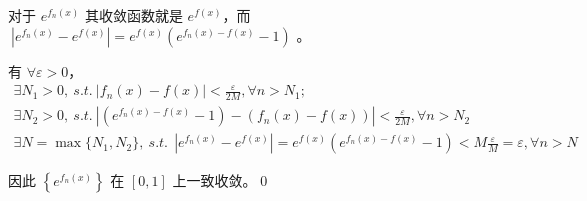 对于 $\displaystyle e^{f_{n}( x)}$ 其收敛函数就是 $\displaystyle e^{f( x)}$，而$\displaystyle \ |e^{f_{n}( x)} -e^{f( x)} |=e^{f( x)}\left( e^{f_{n}( x) -f( x)} -1\right)$ 。

有 $\displaystyle \forall \varepsilon  >0$，
\begin{gather*}
	\exists N_{1}  >0,\ s.t.\ |f_{n}( x) -f( x) |< \frac{\varepsilon }{2M} ,\forall n >N_{1} ;\\
	\exists N_{2}  >0,\ s.t.\ |\left( e^{f_{n}( x) -f( x)} -1\right) -( f_{n}( x) -f( x)) |< \frac{\varepsilon }{2M} ,\forall n > N_{2}\\
	\exists N=\max\{N_{1} ,N_{2}\} ,\ s.t.\ \ |e^{f_{n}( x)} -e^{f( x)} |=e^{f( x)}\left( e^{f_{n}( x) -f( x)} -1\right) < M\frac{\varepsilon }{M} =\varepsilon ,\forall n >N
\end{gather*}

因此 $\displaystyle \left\{e^{f_{n}( x)}\right\}$ 在 $\displaystyle [ 0,1]$ 上一致收敛。\qed 

\ifx\allfiles\undefined

\fi
